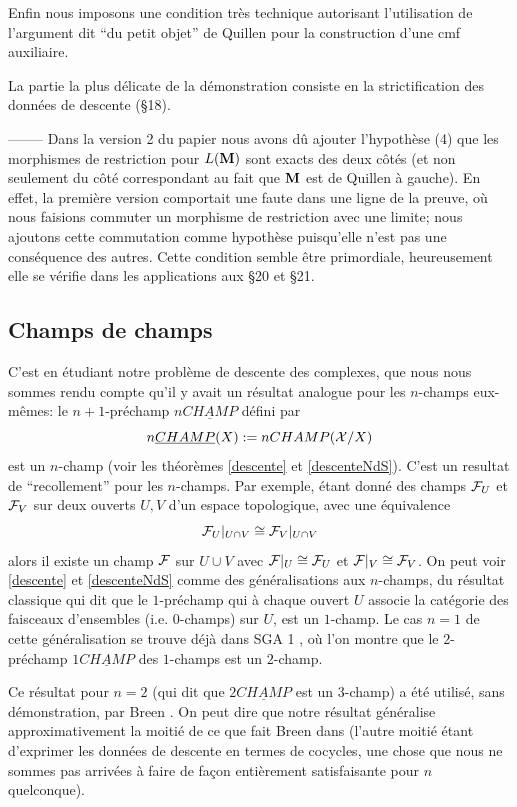 \documentclass[12pt]{article}
\newcommand{\subnumero}[1]{\subsection*{#1}\phantomsection\addcontentsline{toc}{subsection}{#1}}
\newcommand{\mm}{{\bf M}}
\newcommand{\Ff}{{\cal F}}
\newcommand{\Xx}{{\cal X}}
\begin{document}
Enfin nous imposons une condition tr\`es technique autorisant
l'utilisation de l'argument dit ``du petit objet'' de Quillen
pour la construction d'une cmf auxiliaire.

La partie la plus d\'elicate de la d\'emonstration
consiste en la strictification des donn\'ees de descente (\S 18).

\noindent
--------
\newline
Dans la version 2 du papier nous avons d\^u ajouter l'hypoth\`ese (4) que
les morphismes de restriction pour $L(\mm )$ sont exacts des
deux c\^ot\'es (et non seulement du c\^ot\'e correspondant au fait que $\mm$ est
de Quillen \`a gauche). En effet, la premi\`ere version comportait
une faute dans une ligne
de la preuve, o\`u nous faisions commuter un morphisme de restriction avec une
limite; nous ajoutons cette commutation comme hypoth\`ese puisqu'elle n'est pas
une cons\'equence 
des autres.
Cette condition semble \^etre primordiale, 
heureusement
elle se v\'erifie dans les applications aux \S 20 et \S 21. 




\subnumero {Champs de champs}

C'est en \'etudiant notre probl\`eme de descente des complexes,
que nous nous sommes rendu compte qu'il y avait un r\'esultat analogue pour les
$n$-champs eux-m\^emes: le $n+1$-pr\'echamp $n\underline{CHAMP}$ d\'efini par
$$
n\underline{CHAMP}(X):= nCHAMP (\Xx /X)
$$
est un $n$-champ (voir les th\'eor\`emes \ref{descente} et \ref{descenteNdS}).
C'est un resultat de ``recollement'' pour les $n$-champs. Par
exemple, \'etant donn\'e des champs $\Ff _U$ et $\Ff _V$ sur deux ouverts
$U,V$ d'un  espace topologique, avec une \'equivalence
$$
\Ff _U |_{U\cap V} \cong
\Ff _V |_{U\cap V}
$$
alors il existe un champ $\Ff $ sur $U\cup V$ avec $\Ff |_U \cong \Ff _U$
et $\Ff |_V \cong \Ff
_V$. On peut voir \ref{descente} et \ref{descenteNdS}
comme des g\'en\'eralisations aux $n$-champs, du r\'esultat classique qui
dit que le
$1$-pr\'echamp qui \`a
chaque ouvert $U$ associe la cat\'egorie des faisceaux d'ensembles (i.e.
$0$-champs) sur $U$, est un
$1$-champ.  Le cas $n=1$ de cette g\'en\'eralisation se trouve d\'ej\`a
dans SGA 1
\cite{SGA1} \cite{GiraudThese},
o\`u l'on montre que le $2$-pr\'echamp $1\underline{CHAMP}$ des $1$-champs est
un $2$-champ.

Ce r\'esultat pour $n=2$ (qui dit que $2\underline{CHAMP}$ est un $3$-champ) a
\'et\'e utilis\'e, sans d\'emonstration, par Breen \cite{Breen}. On peut
dire que notre r\'esultat g\'en\'eralise approximativement la moiti\'e de ce
que fait Breen dans
\cite{Breen} (l'autre moiti\'e \'etant d'exprimer les donn\'ees de descente
en termes de cocycles,
une chose que nous ne sommes pas arriv\'ees \`a faire
de fa\c{c}on enti\`erement satisfaisante pour $n$ quelconque).
\end{document}

